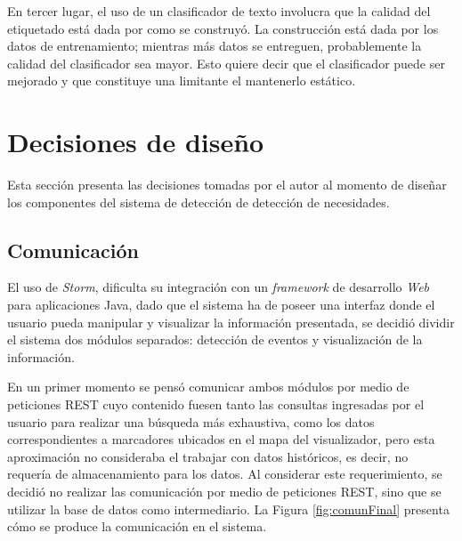 En tercer lugar, el uso de un clasificador de texto involucra que la calidad del etiquetado está dada por como se construyó. La construcción está dada por los datos de entrenamiento; mientras más datos se entreguen, probablemente la calidad del clasificador sea mayor. Esto quiere decir que el clasificador puede ser mejorado y que constituye una limitante el mantenerlo estático.

\section{Decisiones de diseño}
\label{sec:decDiseno}

Esta sección presenta las decisiones tomadas por el autor al momento de diseñar los componentes del sistema de detección de detección de necesidades.

\subsection{Comunicación}
\label{sec:diseno:comunicacion}

El uso de \textit{Storm}, dificulta su integración con un \textit{framework} de desarrollo \textit{Web} para aplicaciones Java, dado que el sistema ha de poseer una interfaz donde el usuario pueda manipular y visualizar la información presentada, se decidió dividir el sistema dos módulos separados: detección de eventos y visualización de la información.

En un primer momento se pensó comunicar ambos módulos por medio de peticiones REST cuyo contenido fuesen tanto las consultas ingresadas por el usuario para realizar una búsqueda más exhaustiva, como los datos correspondientes a marcadores ubicados en el mapa del visualizador, pero esta aproximación no consideraba el trabajar con datos históricos, es decir, no requería de almacenamiento para los datos. Al considerar este requerimiento, se decidió no realizar las comunicación por medio de peticiones REST, sino que se utilizar la base de datos como intermediario. La Figura \ref{fig:comunFinal} presenta cómo se produce la comunicación en el sistema.

